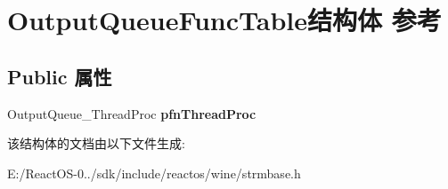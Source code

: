 \hypertarget{struct_output_queue_func_table}{}\section{Output\+Queue\+Func\+Table结构体 参考}
\label{struct_output_queue_func_table}
\subsection*{Public 属性}
\begin{DoxyCompactItemize}
\item 
\mbox{\label{struct_output_queue_func_table_ab8414d69d57a7c60b1d6f4fc2a5e328a}} 
Output\+Queue\+\_\+\+Thread\+Proc {\bfseries pfn\+Thread\+Proc}
\end{DoxyCompactItemize}


该结构体的文档由以下文件生成\+:\begin{DoxyCompactItemize}
\item 
E\+:/\+React\+O\+S-\/0../sdk/include/reactos/wine/strmbase.\+h\end{DoxyCompactItemize}
